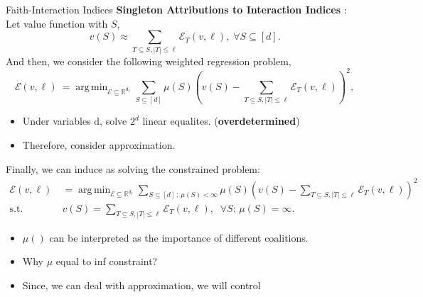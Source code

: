 \documentclass[10pt]{beamer}
\newcommand{\f}{v}
\newcommand{\ex}{\Expl}
\def\Expl{\mathcal{E}}
\DeclareMathOperator*{\argmin}{arg\,min}
\begin{document}
\begin{frame}{Faith-Interaction Indices}
    \textbf{Singleton Attributions to Interaction Indices} : \\
    Let value function with $S$, \[\f(S) \approx \sum_{T \subseteq S, |T| \leq \ell} \Expl_T(\f,\ell),\; \forall S \subseteq [d].\]
    And then, we consider the following weighted regression problem,
    \begin{equation*}
    \label{eqn:weighted_regression}
    \ex(\f, \ell) \ = \argmin_{\Expl \subseteq \mathbb{R}^{d_\ell} } 
    \sum_{S \subseteq [d]}  \mu(S) \left( \f(S) - \sum_{T \subseteq S , |T| \leq \ell}\Expl_T(\f,\ell) \right)^2,
    \tag{9}
    \end{equation*}
    \vspace{1.5em}
    \begin{itemize}[label=\scalebox{0.5}{$\blacksquare$}]
        \item Under variables d, solve $2^d$ linear equalites. (\textbf{overdetermined})
        \item Therefore, consider approximation. 
    \end{itemize}
\end{frame}
\begin{frame}
    Finally, we can induce as solving the constrained problem:
    \begin{align*}
    \ex(\f, \ell) \ 
    &= \argmin_{\Expl \subseteq \mathbb{R}^{d_\ell} } \sum_{S \subseteq [d]\,:\, \mu(S) < \infty}  \mu(S) \left( \f(S) - \sum_{T \subseteq S , |T| \leq \ell}\Expl_T(\f,\ell) \right)^2 \nonumber \\
    \text{s.t.} \ & \f(S) = \sum_{T \subseteq S , |T| \leq \ell}\Expl_T(\f,\ell), \;\;\forall S :\, \mu(S) = \infty.
    \label{eqn:constrained_weighted_regresion}
    \tag{10}
    \end{align*}
    \vspace{2em}
    \begin{itemize}[label=\scalebox{0.5}{$\blacksquare$}]
        \item $\mu()$ can be interpreted as the importance of different coalitions.
        \item Why $\mu$ equal to inf constraint?
        \item Since, we can deal with approximation, we will control 
    \end{itemize}
\end{frame}
\end{document}
